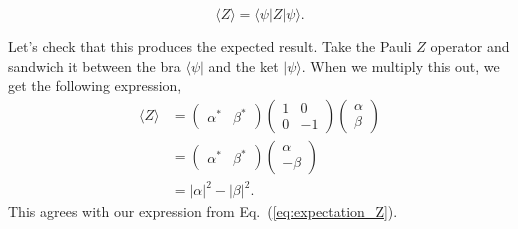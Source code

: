 \begin{equation}
    \langle Z\rangle=\langle\psi|Z| \psi\rangle.
\end{equation}

Let's check that this produces the expected result. Take the Pauli $Z$ operator and sandwich it between the bra $\langle\psi|$ and the ket $|\psi\rangle$. When we multiply this out, we get the following expression,
\begin{equation}
    \begin{aligned}
    \langle Z\rangle &=\left(\begin{array}{ll}
    \alpha^{*} & \beta^{*}
    \end{array}\right)\left(\begin{array}{cc}
    1 & 0 \\
    0 & -1
    \end{array}\right)\left(\begin{array}{l}
    \alpha \\
    \beta
    \end{array}\right) \\
    &=\left(\begin{array}{ll}
    \alpha^{*} & \beta^{*}
    \end{array}\right)\left(\begin{array}{c}
    \alpha \\
    -\beta
    \end{array}\right) \\
    &=|\alpha|^{2}-|\beta|^{2}.
    \end{aligned}
    \label{eq:z-expectation}
\end{equation}
This agrees with our expression from Eq.~(\ref{eq:expectation_Z}).

